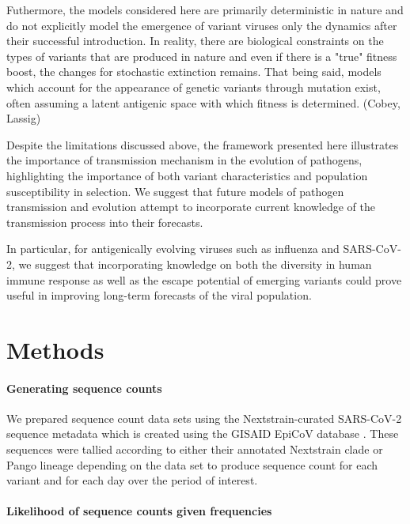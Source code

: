 \documentclass[12pt,oneside,letterpaper]{article}
\begin{document}
Futhermore, the models considered here are primarily deterministic in nature and do not explicitly model the emergence of variant viruses only the dynamics after their successful introduction.
In reality, there are biological constraints on the types of variants that are produced in nature and even if there is a "true" fitness boost, the changes for stochastic extinction remains.
That being said, models which account for the appearance of genetic variants through mutation exist, often assuming a latent antigenic space with which fitness is determined. (Cobey, Lassig)

Despite the limitations discussed above, the framework presented here illustrates the importance of transmission mechanism in the evolution of pathogens, highlighting the importance of both variant characteristics and population susceptibility in selection.
We suggest that future models of pathogen transmission and evolution attempt to incorporate current knowledge of the transmission process into their forecasts.

In particular, for antigenically evolving viruses such as influenza and SARS-CoV-2, we suggest that incorporating knowledge on both the diversity in human immune response as well as the escape potential of emerging variants could prove useful in improving long-term forecasts of the viral population.

\section*{Methods}

\paragraph{Generating sequence counts}%

We prepared sequence count data sets using the Nextstrain-curated SARS-CoV-2 sequence metadata \cite{Hadfield2018} which is created using the GISAID EpiCoV database \cite{khare2021gisaid}.
These sequences were tallied according to either their annotated Nextstrain clade or Pango lineage depending on the data set to produce sequence count for each variant and for each day over the period of interest.

\cite{aksamentov2021nextclade}

\paragraph{Likelihood of sequence counts given frequencies}
\end{document}
